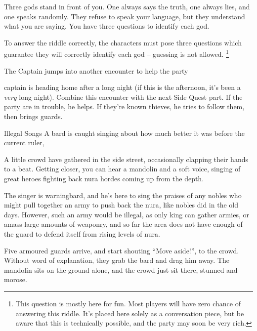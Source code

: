 \begin{multicols}{2}
\begin{boxtext}
Three gods stand in front of you.  One always says the truth, one always lies, and one speaks randomly.  They refuse to speak your language, but they understand what you are saying.  You have three questions to identify each god.
\end{boxtext}

To answer the riddle correctly, the characters must pose three questions which guarantee they will correctly identify each god -- guessing is not allowed.
\footnote{This question is mostly here for fun.  Most players will have zero chance of answering this riddle.
It's placed here solely as a conversation piece, but be aware that this is technically possible, and the party may soon be very rich.}

{\squash The Captain}%
{ jumps into another encounter to help the party}%

\captain

\Gls{captain} is heading home after a long night (if this is the afternoon, it's been a \emph{very} long night).
Combine this encounter with the next Side Quest part.
If the party are in trouble, he helps.
If they're known thieves, he tries to follow them, then brings guards.

{Illegal Songs}%
{A bard is caught singing about how much better it was before the current ruler, }%

\begin{boxtext}
  A little crowd have gathered in the side street, occasionally clapping their hands to a beat.
  Getting closer, you can hear a mandolin and a soft voice, singing of great heroes fighting back nura hordes coming up from the depth.
\end{boxtext}

The singer is \gls{warningbard}, and he's here to sing the praises of any nobles who might pull together an army to push back the nura, like nobles did in the old days.
However, such an army would be illegal, as only \gls{king} can gather armies, or amass large amounts of weaponry, and so far the area does not have enough of the \gls{guard} to defend itself from rising levels of nura.

\begin{boxtext}

  Five armoured guards arrive, and start shouting ``Move aside!'', to the crowd.  Without word of explanation, they grab the bard and drag him away.  The mandolin sits on the ground alone, and the crowd just sit there, stunned and morose.


\end{boxtext}
\end{multicols}
